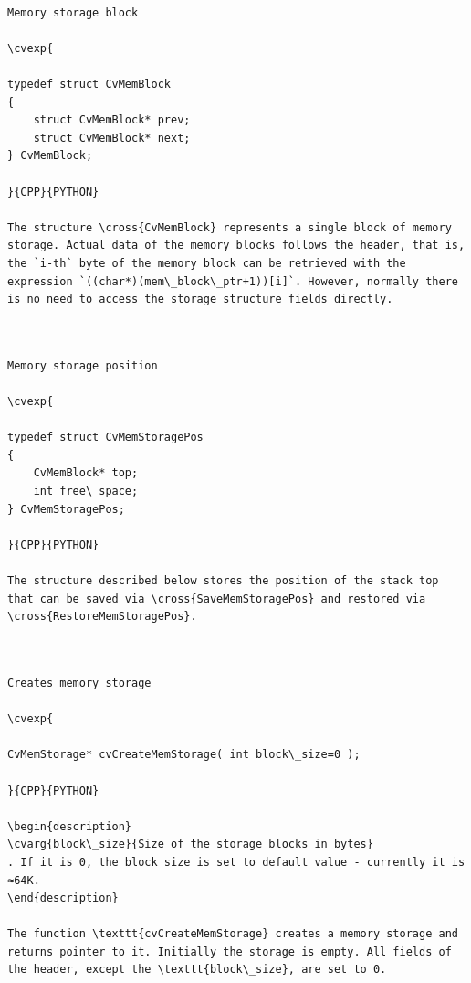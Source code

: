 \label{CvMemBlock}
\begin{verbatim}

Memory storage block

\cvexp{

typedef struct CvMemBlock
{
    struct CvMemBlock* prev;
    struct CvMemBlock* next;
} CvMemBlock;

}{CPP}{PYTHON}

The structure \cross{CvMemBlock} represents a single block of memory storage. Actual data of the memory blocks follows the header, that is, the `i-th` byte of the memory block can be retrieved with the expression `((char*)(mem\_block\_ptr+1))[i]`. However, normally there is no need to access the storage structure fields directly.


\end{verbatim}
\label{CvMemStoragePos}
\begin{verbatim}

Memory storage position

\cvexp{

typedef struct CvMemStoragePos
{
    CvMemBlock* top;
    int free\_space;
} CvMemStoragePos;

}{CPP}{PYTHON}

The structure described below stores the position of the stack top that can be saved via \cross{SaveMemStoragePos} and restored via \cross{RestoreMemStoragePos}.


\end{verbatim}
\label{CreateMemStorage}
\begin{verbatim}

Creates memory storage

\cvexp{

CvMemStorage* cvCreateMemStorage( int block\_size=0 );

}{CPP}{PYTHON}

\begin{description}
\cvarg{block\_size}{Size of the storage blocks in bytes}
. If it is 0, the block size is set to default value - currently it is ≈64K.
\end{description}

The function \texttt{cvCreateMemStorage} creates a memory storage and returns pointer to it. Initially the storage is empty. All fields of the header, except the \texttt{block\_size}, are set to 0.


\end{verbatim}
\label{CreateChildMemStorage}
